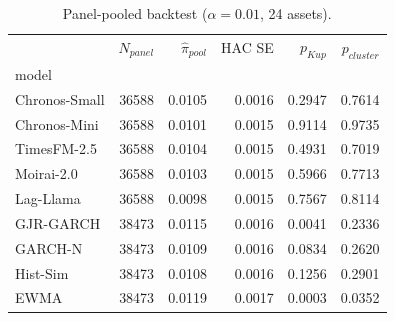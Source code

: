 \begin{table}[htbp]
\centering
\caption{Panel-pooled backtest ($\alpha=0.01$, 24 assets).}
\label{tab:panel_pooled}
\footnotesize
\begin{tabular}{lrrrrr}
\toprule
 & $N_{panel}$ & $\hat{\pi}_{pool}$ & HAC SE & $p_{Kup}$ & $p_{cluster}$ \\
model &  &  &  &  &  \\
\midrule
Chronos-Small & 36588 & 0.0105 & 0.0016 & 0.2947 & 0.7614 \\
Chronos-Mini & 36588 & 0.0101 & 0.0015 & 0.9114 & 0.9735 \\
TimesFM-2.5 & 36588 & 0.0104 & 0.0015 & 0.4931 & 0.7019 \\
Moirai-2.0 & 36588 & 0.0103 & 0.0015 & 0.5966 & 0.7713 \\
Lag-Llama & 36588 & 0.0098 & 0.0015 & 0.7567 & 0.8114 \\
GJR-GARCH & 38473 & 0.0115 & 0.0016 & 0.0041 & 0.2336 \\
GARCH-N & 38473 & 0.0109 & 0.0016 & 0.0834 & 0.2620 \\
Hist-Sim & 38473 & 0.0108 & 0.0016 & 0.1256 & 0.2901 \\
EWMA & 38473 & 0.0119 & 0.0017 & 0.0003 & 0.0352 \\
\bottomrule
\end{tabular}
\end{table}
